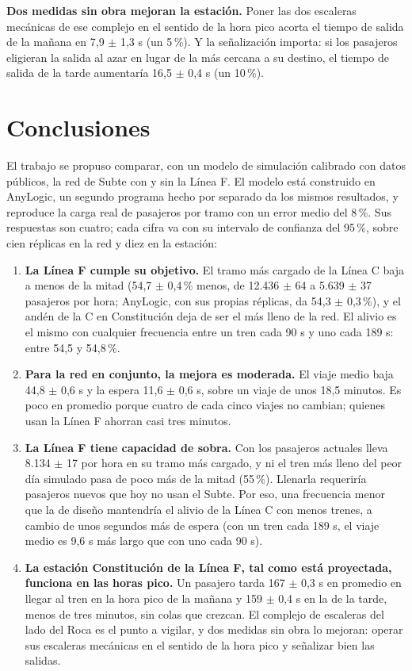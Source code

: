 \documentclass{article}
\begin{document}
\textbf{Dos medidas sin obra mejoran la estación.} Poner las dos escaleras mecánicas de ese complejo en el
sentido de la hora pico acorta el tiempo de salida de la mañana en 7,9 $\pm$ 1,3 s (un 5\,\%). Y la
señalización importa: si los pasajeros eligieran la salida al azar en lugar de la más cercana a su destino, el
tiempo de salida de la tarde aumentaría 16,5 $\pm$ 0,4 s (un 10\,\%).

\section{Conclusiones}
\label{sec:conclusiones}

El trabajo se propuso comparar, con un modelo de simulación calibrado con datos públicos, la red de Subte
con y sin la Línea F. El modelo está construido en AnyLogic, un segundo programa hecho por separado da los
mismos resultados, y reproduce la carga real de pasajeros por tramo con un error medio del 8\,\%. Sus
respuestas son cuatro; cada cifra va con su intervalo de confianza del 95\,\%, sobre cien réplicas en la red y
diez en la estación:

\begin{enumerate}
  \item \textbf{La Línea F cumple su objetivo.} El tramo más cargado de la Línea C baja a menos de la mitad
    (54,7 $\pm$ 0,4\,\% menos, de 12.436 $\pm$ 64 a 5.639 $\pm$ 37 pasajeros por hora; AnyLogic, con sus
    propias réplicas, da 54,3 $\pm$ 0,3\,\%), y el andén de la C en
    Constitución deja de ser el más lleno de la red. El alivio es el mismo con cualquier frecuencia entre un
    tren cada 90 s y uno cada 189 s: entre 54,5 y 54,8\,\%.
  \item \textbf{Para la red en conjunto, la mejora es moderada.} El viaje medio baja 44,8 $\pm$ 0,6 s y la
    espera 11,6 $\pm$ 0,6 s, sobre un viaje de unos 18,5 minutos. Es poco en promedio porque cuatro de cada
    cinco viajes no cambian; quienes usan la Línea F ahorran casi tres minutos.
  \item \textbf{La Línea F tiene capacidad de sobra.} Con los pasajeros actuales lleva 8.134 $\pm$ 17 por hora
    en su tramo más cargado, y ni el tren más lleno del peor día simulado pasa de poco más de la mitad
    (55\,\%). Llenarla requeriría pasajeros nuevos que hoy no usan el Subte. Por eso, una frecuencia menor que
    la de diseño mantendría el alivio de la Línea C con menos trenes, a cambio de unos segundos más de espera
    (con un tren cada 189 s, el viaje medio es 9,6 s más largo que con uno cada 90 s).
  \item \textbf{La estación Constitución de la Línea F, tal como está proyectada, funciona en las horas
    pico.} Un pasajero tarda 167 $\pm$ 0,3 s en promedio en llegar al tren en la hora pico de la mañana y
    159 $\pm$ 0,4 s en la de la tarde, menos de tres minutos, sin colas que crezcan. El complejo de
    escaleras del lado del Roca es el punto a vigilar, y dos medidas sin obra lo mejoran: operar sus escaleras
    mecánicas en el sentido de la hora pico y señalizar bien las salidas.
\end{enumerate}
\end{document}
